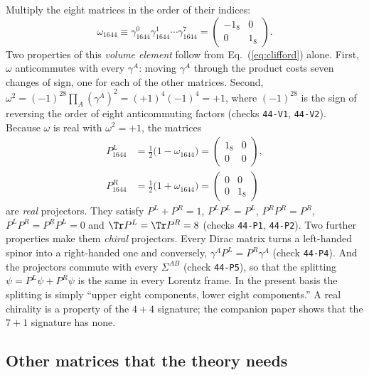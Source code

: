 Multiply the eight matrices in the order of their indices:
\begin{equation}
\omega_{1644}\equiv\gamma_{1644}^0\gamma_{1644}^1\cdots\gamma_{1644}^7=\begin{pmatrix}-1_8&0\\0&1_8\end{pmatrix}.
\label{eq:omega}
\end{equation}
Two properties of this \emph{volume element} follow from Eq.~(\ref{eq:clifford}) alone. First,
$\omega$ anticommutes with every $\gamma^A$: moving $\gamma^A$ through the product costs seven changes
of sign, one for each of the other matrices. Second,
$\omega^2=(-1)^{28}\prod_A(\gamma^A)^2=(+1)^4(-1)^4=+1$, where $(-1)^{28}$ is the sign of reversing the
order of eight anticommuting factors (checks \texttt{44-V1}, \texttt{44-V2}). Because $\omega$ is real
with $\omega^2=+1$, the matrices
\begin{align}
P_{1644}^{L}&=\tfrac12\big(1-\omega_{1644}\big)=\begin{pmatrix}1_8&0\\0&0\end{pmatrix},\nonumber\\
P_{1644}^{R}&=\tfrac12\big(1+\omega_{1644}\big)=\begin{pmatrix}0&0\\0&1_8\end{pmatrix}
\label{eq:PLPR}
\end{align}
are \emph{real} projectors. They satisfy $P^{L}+P^{R}=1$, $P^{L}P^{L}=P^{L}$, $P^{R}P^{R}=P^{R}$,
$P^{L}P^{R}=P^{R}P^{L}=0$ and $\Tr P^{L}=\Tr P^{R}=8$ (checks \texttt{44-P1}, \texttt{44-P2}). Two
further properties make them \emph{chiral} projectors. Every Dirac matrix turns a left-handed spinor
into a right-handed one and conversely, $\gamma^AP^{L}=P^{R}\gamma^A$ (check \texttt{44-P4}). And the
projectors commute with every $\Sigma^{AB}$ (check \texttt{44-P5}), so that the splitting
$\psi=P^{L}\psi+P^{R}\psi$ is the same in every Lorentz frame. In the present basis the splitting is
simply ``upper eight components, lower eight components.'' A real chirality is a property of the
$4+4$ signature; the companion paper shows that the $7+1$ signature has none.

\subsection{Other matrices that the theory needs}
\label{sec:other}

